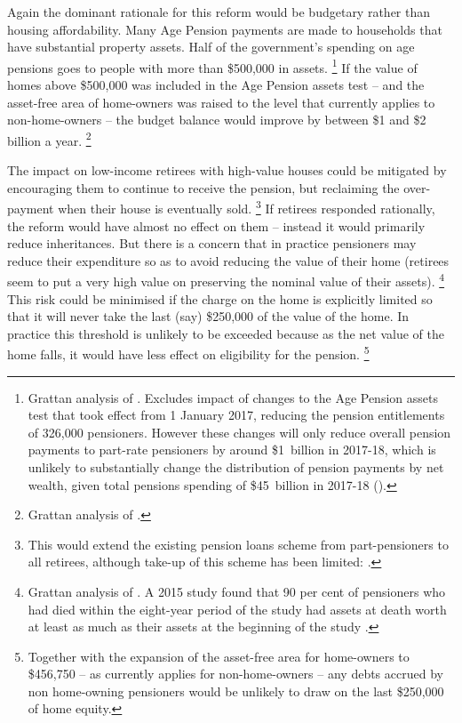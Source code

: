 Again the dominant rationale for this reform would be budgetary rather than housing affordability.
Many Age Pension payments are made to households that have substantial property assets.
Half of the government's spending on age pensions goes to people with more than \$500,000 in assets.%
	\footnote{Grattan analysis of \textcite{ABS2015MicrodataIncomehousing}. Excludes impact of changes to the Age Pension assets test that took effect from 1 January 2017, reducing the pension entitlements of 326,000 pensioners.
	However these changes will only reduce overall pension payments to part-rate pensioners by around \$1~billion in 2017-18, which is unlikely to substantially change the distribution of pension payments by net wealth, given total pensions spending of \$45~billion in 2017-18 (\textcites{FairerAccess2017MorrisonMediaRelease}{Budget2017-18-BP1}).}
If the value of homes above \$500,000 was included in the Age Pension assets test -- and the asset-free area of home-owners was raised to the level that currently applies to non-home-owners -- the budget balance would improve by between \$1  and \$2 billion a year.%
	\footnote{Grattan analysis of \textcite{ABS2015MicrodataIncomehousing}.} 

The impact on low-income retirees with high-value houses could be mitigated by encouraging them to continue to receive the pension, but reclaiming the over-payment when their house is eventually sold.%
	\footnote{This would extend the existing pension loans scheme from part-pensioners to all retirees, although take-up of this scheme has been limited: \textcite{TAI-2014-Boosting-retirement-incomes-easy-way}.}
If retirees responded rationally, the reform would have almost no effect on them -- instead it would primarily reduce inheritances. 
But there is a concern that in practice pensioners may reduce their expenditure so as to avoid reducing the value of their home (retirees seem to put a very high value on preserving the nominal value of their assets).%
    \footnote{Grattan analysis of \textcite{ABS2015MicrodataIncomehousing}.
	A 2015 study found that 90 per cent of pensioners who had died within the eight-year period of the study had assets at death worth at least as much as their assets at the beginning of the study \textcite{WuEtAlAgePensioner2015}.} 
This risk could be minimised if the charge on the home is explicitly limited so that it will never take the last (say) \$250,000 of the value of the home.
In practice this threshold is unlikely to be exceeded because as the net value of the home falls, it would have less effect on eligibility for the pension.%
    \footnote{Together with the expansion of the asset-free area for home-owners to \$456,750 -- as currently applies for non-home-owners -- any debts accrued by non home-owning pensioners would be unlikely to draw on the last \$250,000 of home equity.}

